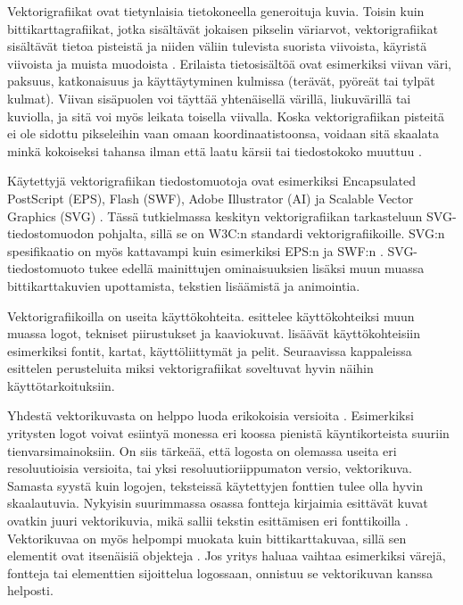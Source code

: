 \documentclass[utf8,bachelor]{gradu3}
\begin{document}
Vektorigrafiikat ovat tietynlaisia tietokoneella generoituja kuvia. Toisin kuin bittikarttagrafiikat, jotka sisältävät jokaisen pikselin väriarvot, vektorigrafiikat sisältävät tietoa pisteistä ja niiden väliin tulevista suorista viivoista, käyristä viivoista ja muista muodoista \parencites{RefWorks:doc:5bdc5224e4b05afcfde5b159}{RefWorks:doc:5bdc5292e4b05afcfde5b171}. Erilaista tietosisältöä ovat esimerkiksi viivan väri, paksuus, katkonaisuus ja käyttäytyminen kulmissa (terävät, pyöreät tai tylpät kulmat). Viivan sisäpuolen voi täyttää yhtenäisellä värillä, liukuvärillä tai kuviolla, ja sitä voi myös leikata toisella viivalla. \parencite{RefWorks:doc:5bd74719e4b0e42e08f6333b} Koska vektorigrafiikan pisteitä ei ole sidottu pikseleihin vaan omaan koordinaatistoonsa, voidaan sitä skaalata minkä kokoiseksi tahansa ilman että laatu kärsii tai tiedostokoko muuttuu \parencite{RefWorks:doc:5bdc5292e4b05afcfde5b171}.

Käytettyjä vektorigrafiikan tiedostomuotoja ovat esimerkiksi Encapsulated PostScript (EPS), Flash (SWF), Adobe Illustrator (AI) ja Scalable Vector Graphics (SVG) \parencite{RefWorks:doc:5bdc5224e4b05afcfde5b159}. Tässä tutkielmassa keskityn vektorigrafiikan tarkasteluun SVG-tiedostomuodon pohjalta, sillä se on W3C:n standardi vektorigrafiikoille. SVG:n spesifikaatio on myös kattavampi kuin esimerkiksi EPS:n \parencite{RefWorks:doc:5bdc900de4b0afdabde32fb7} ja SWF:n \parencite{RefWorks:doc:5bdc9306e4b069b454d8459e}. SVG-tiedostomuoto tukee edellä mainittujen ominaisuuksien lisäksi muun muassa bittikarttakuvien upottamista, tekstien lisäämistä ja animointia. \parencite{RefWorks:doc:5bd74719e4b0e42e08f6333b}

Vektorigrafiikoilla on useita käyttökohteita. \textcite{RefWorks:doc:5bdc5224e4b05afcfde5b159} esittelee käyttökohteiksi muun muassa logot, tekniset piirustukset ja kaaviokuvat. \textcite{RefWorks:doc:5bdd9b5ae4b0954dddb26329} lisäävät käyttökohteisiin esimerkiksi fontit, kartat, käyttöliittymät ja pelit. Seuraavissa kappaleissa esittelen perusteluita miksi vektorigrafiikat soveltuvat hyvin näihin käyttötarkoituksiin.

Yhdestä vektorikuvasta on helppo luoda erikokoisia versioita \parencite{RefWorks:doc:5bdc5224e4b05afcfde5b159}. Esimerkiksi yritysten logot voivat esiintyä monessa eri koossa pienistä käyntikorteista suuriin tienvarsimainoksiin. On siis tärkeää, että logosta on olemassa useita eri resoluutioisia versioita, tai yksi resoluutioriippumaton versio, vektorikuva. Samasta syystä kuin logojen, teksteissä käytettyjen fonttien tulee olla hyvin skaalautuvia. Nykyisin suurimmassa osassa fontteja kirjaimia esittävät kuvat ovatkin juuri vektorikuvia, mikä sallii tekstin esittämisen eri fonttikoilla \parencite{RefWorks:doc:5bdc5224e4b05afcfde5b159}. Vektorikuvaa on myös helpompi muokata kuin bittikarttakuvaa, sillä sen elementit ovat itsenäisiä objekteja \parencite{RefWorks:doc:5bdc5224e4b05afcfde5b159}. Jos yritys haluaa vaihtaa esimerkiksi värejä, fontteja tai elementtien sijoittelua logossaan, onnistuu se vektorikuvan kanssa helposti.
\end{document}

